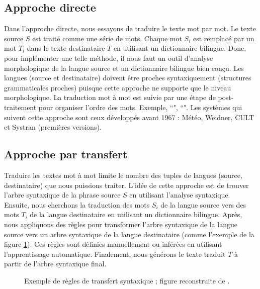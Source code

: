 \documentclass{KodeBook}
\begin{document}
\subsection{Approche directe}

Dans l'approche directe, nous essayons de traduire le texte mot par mot. 
Le texte source $S$ est traité comme une série de mots. 
Chaque mot $S_i$ est remplacé par un mot $T_i$ dans le texte destinataire $T$ en utilisant un dictionnaire bilingue. 
Donc, pour implémenter une telle méthode, il nous faut un outil d'analyse morphologique de la langue source et un dictionnaire bilingue bien conçu. 
Les langues (source et destinataire) doivent être proches syntaxiquement (structures grammaticales proches) puisque cette approche ne supporte que le niveau morphologique. 
La traduction mot à mot est suivie par une étape de post-traitement pour organiser l'ordre des mots. 
Exemple, ``", ``".
Les systèmes qui suivent cette approche sont ceux développés avant 1967 : Météo, Weidner, CULT et Systran (premières versions).

\subsection{Approche par transfert}

Traduire les textes mot à mot limite le nombre des tuples de langues (source, destinataire) que nous puissions traiter. 
L'idée de cette approche est de trouver l'arbre syntaxique de la phrase source $S$ en utilisant l'analyse syntaxique. 
Ensuite, nous cherchons la traduction des mots $S_i$ de la langue source vers des mots $T_i$ de la langue destinataire en utilisant un dictionnaire bilingue.
Après, nous appliquons des règles pour transformer l'arbre syntaxique de la langue source vers un arbre syntaxique de la langue destinataire (comme l'exemple de la figure \ref{fig:mt-transfert-exp}).
Ces règles sont définies manuellement ou inférées en utilisant l'apprentissage automatique.
Finalement, nous générons le texte traduit $T$ à partir de l'arbre syntaxique final.

\begin{figure}[ht]
	\centering
	\caption[Exemple de règles de transfert syntaxique]{Exemple de règles de transfert syntaxique ; figure reconstruite de \cite{06-quah}.}
	\label{fig:mt-transfert-exp}
\end{figure}
\end{document}
